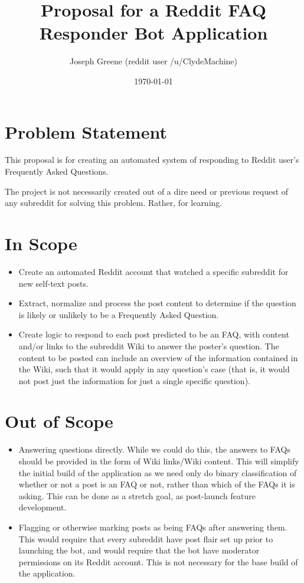 \documentclass[dvips,12pt]{article}
\begin{document}
\title{Proposal for a Reddit FAQ Responder Bot Application}
\author{Joseph Greene (reddit user /u/ClydeMachine)}
\date{\today}

\maketitle

\section{Problem Statement}

This proposal is for creating an automated system of responding to Reddit user's Frequently Asked Questions. 

The project is not necessarily created out of a dire need or previous request of any subreddit for solving this problem. Rather, for learning.

\section{In Scope}


\begin{itemize}
\item Create an automated Reddit account that watched a specific subreddit for new self-text posts.
\item Extract, normalize and process the post content to determine if the question is likely or unlikely to be a Frequently Asked Question.
\item Create logic to respond to each post predicted to be an FAQ, with content and/or links to the subreddit Wiki to answer the poster's question. The content to be posted can include an overview of the information contained in the Wiki, such that it would apply in any question's case (that is, it would not post just the information for just a single specific question).
\end{itemize}

\section{Out of Scope}

\begin{itemize}
\item Answering questions directly. While we could do this, the answers to FAQs should be provided in the form of Wiki links/Wiki content. This will simplify the initial build of the application as we need only do binary classification of whether or not a post is an FAQ or not, rather than which of the FAQs it is asking. This can be done as a stretch goal, as post-launch feature development.
\item Flagging or otherwise marking posts as being FAQs after answering them. This would require that every subreddit have post flair set up prior to launching the bot, and would require that the bot have moderator permissions on its Reddit account. This is not necessary for the base build of the application.
\end{itemize}
\end{document}
